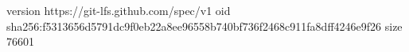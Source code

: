 version https://git-lfs.github.com/spec/v1
oid sha256:f5313656d5791dc9f0eb22a8ee96558b740bf736f2468c911fa8dff4246e9f26
size 76601
